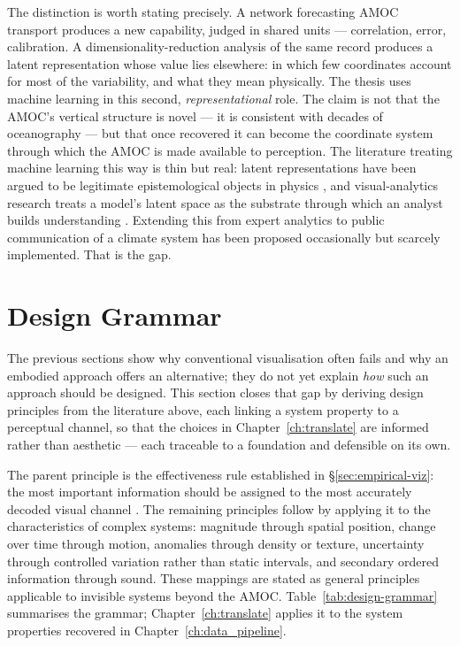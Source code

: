 The distinction is worth stating precisely. A network forecasting AMOC transport produces a new capability, judged in shared units --- correlation, error, calibration. A dimensionality-reduction analysis of the same record produces a latent representation whose value lies elsewhere: in which few coordinates account for most of the variability, and what they mean physically. The thesis uses machine learning in this second, \emph{representational} role. The claim is not that the AMOC's vertical structure is novel --- it is consistent with decades of oceanography \citep{hannachi2007, buckley2016} --- but that once recovered it can become the coordinate system through which the AMOC is made available to perception. The literature treating machine learning this way is thin but real: latent representations have been argued to be legitimate epistemological objects in physics \citep{iten2020}, and visual-analytics research treats a model's latent space as the substrate through which an analyst builds understanding \citep{sacha2018}. Extending this from expert analytics to public communication of a climate system has been proposed occasionally \citep{cabrera2023} but scarcely implemented. That is the gap.

\section{Design Grammar}
\label{sec:design-grammar}

The previous sections show why conventional visualisation often fails and why an embodied approach offers an alternative; they do not yet explain \emph{how} such an approach should be designed. This section closes that gap by deriving design principles from the literature above, each linking a system property to a perceptual channel, so that the choices in Chapter~\ref{ch:translate} are informed rather than aesthetic --- each traceable to a foundation and defensible on its own.

The parent principle is the effectiveness rule established in \S\ref{sec:empirical-viz}: the most important information should be assigned to the most accurately decoded visual channel \citep{bertin1983, clevelandmcgill1984, munzner2014}. The remaining principles follow by applying it to the characteristics of complex systems: magnitude through spatial position, change over time through motion, anomalies through density or texture, uncertainty through controlled variation rather than static intervals, and secondary ordered information through sound. These mappings are stated as general principles applicable to invisible systems beyond the AMOC. Table~\ref{tab:design-grammar} summarises the grammar; Chapter~\ref{ch:translate} applies it to the system properties recovered in Chapter~\ref{ch:data_pipeline}.

